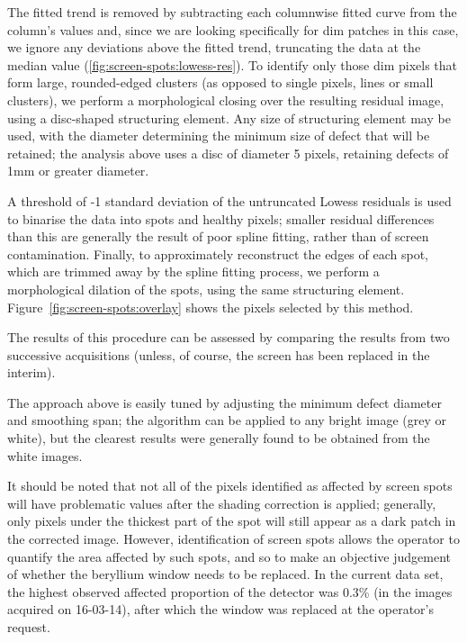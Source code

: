 \documentclass[\main/IO-Pixels.tex]{subfiles}
\begin{document}
The fitted trend is removed by subtracting each columnwise fitted curve from the column's values and, since we are looking specifically for dim patches in this case, we ignore any deviations above the fitted trend, truncating the data at the median value (\ref{fig:screen-spots:lowess-res}). To identify only those dim pixels that form large, rounded-edged clusters (as opposed to single pixels, lines or small clusters), we perform a morphological closing \cite{Vincent1997} over the resulting residual image, using a disc-shaped structuring element. Any size of structuring element may be used, with the diameter determining the minimum size of defect that will be retained; the analysis above uses a disc of diameter 5 pixels, retaining defects of 1mm or greater diameter. 

A threshold of -1 standard deviation of the untruncated Lowess residuals is used to binarise the data into spots and healthy pixels; smaller residual differences than this are generally the result of poor spline fitting, rather than of screen contamination. Finally, to approximately reconstruct the edges of each spot, which are trimmed away by the spline fitting process, we perform a morphological dilation of the spots, using the same structuring element. Figure~\ref{fig:screen-spots:overlay} shows the pixels selected by this method.

The results of this procedure can be assessed by comparing the results from two successive acquisitions (unless, of course, the screen has been replaced in the interim). 


The approach above is easily tuned by adjusting the minimum defect diameter and smoothing span; the algorithm can be applied to any bright image (grey or white), but the clearest results were generally found to be obtained from the white images.

It should be noted that not all of the pixels identified as affected by screen spots will have problematic values after the shading correction is applied; generally, only pixels under the thickest part of the spot will still appear as a dark patch in the corrected image. However, identification of screen spots allows the operator to  quantify the area affected by such spots, and so to make an objective judgement of whether the beryllium window needs to be replaced. In the current data set, the highest observed affected proportion of the detector was 0.3\% (in the images acquired on 16-03-14), after which the window was replaced at the operator's request.
\end{document}
